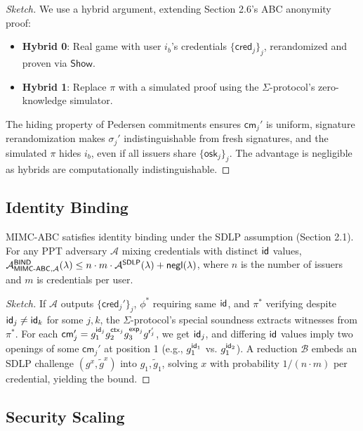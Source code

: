 \begin{proof}[Sketch]
We use a hybrid argument, extending Section 2.6’s ABC anonymity proof:
\begin{itemize}
    \item \textbf{Hybrid 0}: Real game with user $i_b$’s credentials $\{\mathsf{cred}_j\}_j$, rerandomized and proven via $\mathsf{Show}$.
    \item \textbf{Hybrid 1}: Replace $\pi$ with a simulated proof using the $\Sigma$-protocol’s zero-knowledge simulator.
\end{itemize}
The hiding property of Pedersen commitments ensures $\mathsf{cm}_j'$ is uniform, signature rerandomization makes $\sigma_j'$ indistinguishable from fresh signatures, and the simulated $\pi$ hides $i_b$, even if all issuers share $\{\mathsf{osk}_j\}_j$. The advantage is negligible as hybrids are computationally indistinguishable.
\end{proof}

\subsection{Identity Binding}

\begin{theorem}
MIMC-ABC satisfies identity binding under the SDLP assumption (Section 2.1). For any PPT adversary $\mathcal{A}$ mixing credentials with distinct $\mathsf{id}$ values, $\mathcal{A}^{\mathsf{BIND}}_{\mathsf{MIMC\text{-}ABC}, \mathcal{A}}(\lambda) \leq n \cdot m \cdot \mathcal{A}^{\mathsf{SDLP}}(\lambda) + \mathsf{negl}(\lambda)$, where $n$ is the number of issuers and $m$ is credentials per user.
\end{theorem}

\begin{proof}[Sketch]
If $\mathcal{A}$ outputs $\{\mathsf{cred}_j'\}_j$, $\phi^*$ requiring same $\mathsf{id}$, and $\pi^*$ verifying despite $\mathsf{id}_j \neq \mathsf{id}_k$ for some $j, k$, the $\Sigma$-protocol’s special soundness extracts witnesses from $\pi^*$. For each $\mathsf{cm}_j' = g_1^{\mathsf{id}_j} g_2^{\mathsf{ctx}_j} g_3^{\mathsf{exp}_j} g^{\mathsf{r}_j'}$, we get $\mathsf{id}_j$, and differing $\mathsf{id}$ values imply two openings of some $\mathsf{cm}_j'$ at position 1 (e.g., $g_1^{\mathsf{id}_1}$ vs. $g_1^{\mathsf{id}_2}$). A reduction $\mathcal{B}$ embeds an SDLP challenge $(g^x, \tilde{g}^x)$ into $g_1, \tilde{g}_1$, solving $x$ with probability $1/(n \cdot m)$ per credential, yielding the bound.
\end{proof}

\subsection{Security Scaling}

